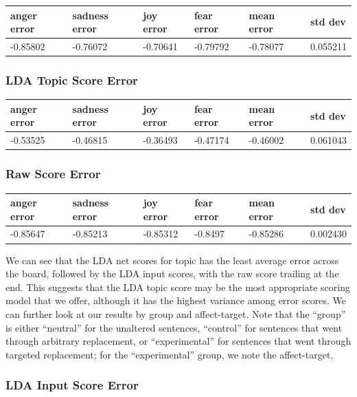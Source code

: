 \documentclass[11pt, twoside, reqno]{book}
\begin{document}
\begin{tabular}{|l|l|l|l|l|l|}
\hline
    anger error & sadness error & joy error & fear error & mean error & std dev \\ \hline
    -0.85802 & -0.76072 & -0.70641 & -0.79792 & -0.78077 & 0.055211 \\ \hline
\end{tabular}
\vspace{16pt}

\subsubsection{\textbf{LDA Topic Score Error}}

\begin{tabular}{|l|l|l|l|l|l|}
\hline
    anger error & sadness error & joy error & fear error & mean error & std dev \\ \hline
    -0.53525 & -0.46815 & -0.36493 & -0.47174 & -0.46002 & 0.061043 \\ \hline
\end{tabular}
\vspace{16pt}

\subsubsection{\textbf{Raw Score Error}}
\begin{tabular}{|l|l|l|l|l|l|}
\hline
    anger error & sadness error & joy error & fear error & mean error & std dev \\ \hline
    -0.85647 & -0.85213 & -0.85312 & -0.8497 & -0.85286 & 0.002430 \\ \hline
\end{tabular}
\vspace{16pt}

We can see that the LDA net scores for topic has the least average error across the board, followed by the LDA input scores, with the raw score trailing at the end. This suggests that the LDA topic score may be the most appropriate scoring model that we offer, although it has the highest variance among error scores. We can further look at our results by group and affect-target. Note that the ``group'' is either ``neutral'' for the unaltered sentences, ``control'' for sentences that went through arbitrary replacement, or ``experimental'' for sentences that went through targeted replacement; for the ``experimental'' group, we note the affect-target.

\subsubsection{\textbf{LDA Input Score Error}}
\end{document}
